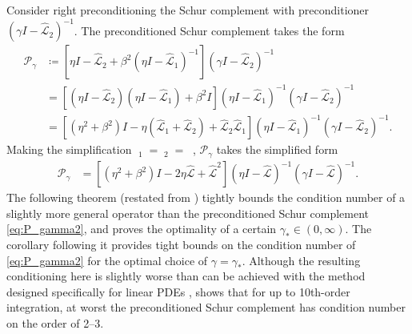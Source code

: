 \documentclass[review]{siamart}
\DeclareMathOperator{\cL}{\widehat{\mathcal{L}}}
\begin{document}
Consider right preconditioning the Schur complement with preconditioner
$(\gamma I- \widehat{\mathcal{L}}_2)^{-1}$. The preconditioned Schur complement
takes the form
%
\begin{align}\label{eq:P_gamma}
\mathcal{P}_\gamma &\coloneqq
	\left[\eta I - \widehat{\mathcal{L}}_2 + \beta^2 (\eta I - \widehat{\mathcal{L}}_1)^{-1}\right]
	(\gamma I- \widehat{\mathcal{L}}_2)^{-1} \\
& = \left[(\eta I - \widehat{\mathcal{L}}_2)(\eta I - \widehat{\mathcal{L}}_1) + \beta^2 I\right]
	(\eta I- \widehat{\mathcal{L}}_1)^{-1}(\gamma I- \widehat{\mathcal{L}}_2)^{-1} \nonumber\\
& = \left[ (\eta^2+\beta^2) I - \eta (\widehat{\mathcal{L}}_1 + \widehat{\mathcal{L}}_2) +
		\widehat{\mathcal{L}}_2\widehat{\mathcal{L}}_1 \right]
		(\eta I- \widehat{\mathcal{L}}_1)^{-1}(\gamma I- \widehat{\mathcal{L}}_2)^{-1}.
		\nonumber
\end{align}
%
Making the simplification $\cL_1 = \cL_2 = \cL$, $\mathcal{P}_\gamma$ takes the
simplified form
%
\begin{align}\label{eq:P_gamma2}
\mathcal{P}_\gamma & = \left[ (\eta^2+\beta^2) I - 2\eta \widehat{\mathcal{L}} +
	\widehat{\mathcal{L}}^2 \right](\eta I- \widehat{\mathcal{L}})^{-1}
	(\gamma I- \widehat{\mathcal{L}})^{-1}.
\end{align}
%
The following theorem (restated from \cite[Th. 5]{irk1}) tightly bounds
the condition number of a slightly more general operator than the preconditioned
Schur complement \eqref{eq:P_gamma2}, and proves the optimality of a certain
$\gamma_* \in (0,
\infty)$. The corollary following it provides tight bounds on the condition
number of \eqref{eq:P_gamma2} for the optimal choice of $\gamma = \gamma_*$.
%
Although the resulting conditioning here is slightly worse than can be achieved with the
method designed specifically for linear PDEs \cite[Cor. 6]{irk1},  shows that
for up to 10th-order integration, at worst the preconditioned Schur complement
has condition number on the order of 2--3.
\end{document}
